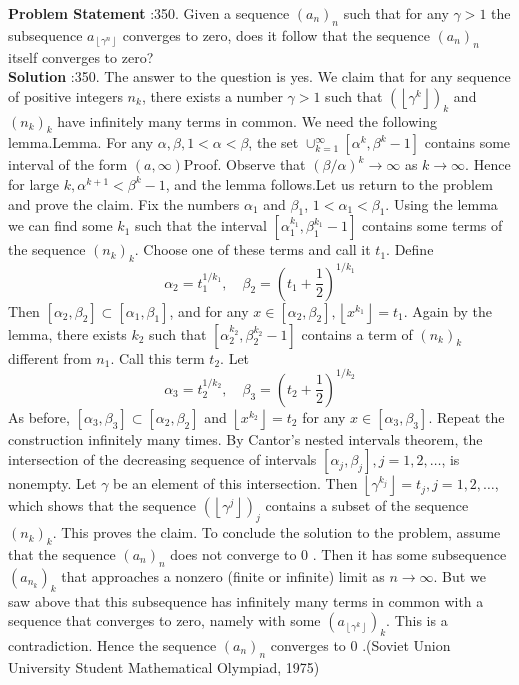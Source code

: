 \documentclass[10pt]{article}
\begin{document}
\textbf{Problem Statement} :350. Given a sequence $\left(a_{n}\right)_{n}$ such that for any $\gamma>1$ the subsequence $a_{\left\lfloor\gamma^{n}\right\rfloor}$ converges to zero, does it follow that the sequence $\left(a_{n}\right)_{n}$ itself converges to zero?\\
\textbf{Solution} :350. The answer to the question is yes. We claim that for any sequence of positive integers $n_{k}$, there exists a number $\gamma>1$ such that $\left(\left\lfloor\gamma^{k}\right\rfloor\right)_{k}$ and $\left(n_{k}\right)_{k}$ have infinitely many terms in common. We need the following lemma.Lemma. For any $\alpha, \beta, 1<\alpha<\beta$, the set $\cup_{k=1}^{\infty}\left[\alpha^{k}, \beta^{k}-1\right]$ contains some interval of the form $(a, \infty)$Proof. Observe that $(\beta / \alpha)^{k} \rightarrow \infty$ as $k \rightarrow \infty$. Hence for large $k, \alpha^{k+1}<\beta^{k}-1$, and the lemma follows.Let us return to the problem and prove the claim. Fix the numbers $\alpha_{1}$ and $\beta_{1}$, $1<\alpha_{1}<\beta_{1}$. Using the lemma we can find some $k_{1}$ such that the interval $\left[\alpha_{1}^{k_{1}}, \beta_{1}^{k_{1}}-1\right]$ contains some terms of the sequence $\left(n_{k}\right)_{k}$. Choose one of these terms and call it $t_{1}$. Define$$ \alpha_{2}=t_{1}^{1 / k_{1}}, \quad \beta_{2}=\left(t_{1}+\frac{1}{2}\right)^{1 / k_{1}} $$Then $\left[\alpha_{2}, \beta_{2}\right] \subset\left[\alpha_{1}, \beta_{1}\right]$, and for any $x \in\left[\alpha_{2}, \beta_{2}\right],\left\lfloor x^{k_{1}}\right\rfloor=t_{1}$. Again by the lemma, there exists $k_{2}$ such that $\left[\alpha_{2}^{k_{2}}, \beta_{2}^{k_{2}}-1\right]$ contains a term of $\left(n_{k}\right)_{k}$ different from $n_{1}$. Call this term $t_{2}$. Let$$ \alpha_{3}=t_{2}^{1 / k_{2}}, \quad \beta_{3}=\left(t_{2}+\frac{1}{2}\right)^{1 / k_{2}} $$As before, $\left[\alpha_{3}, \beta_{3}\right] \subset\left[\alpha_{2}, \beta_{2}\right]$ and $\left\lfloor x^{k_{2}}\right\rfloor=t_{2}$ for any $x \in\left[\alpha_{3}, \beta_{3}\right]$. Repeat the construction infinitely many times. By Cantor's nested intervals theorem, the intersection of the decreasing sequence of intervals $\left[\alpha_{j}, \beta_{j}\right], j=1,2, \ldots$, is nonempty. Let $\gamma$ be an element of this intersection. Then $\left\lfloor\gamma^{k_{j}}\right\rfloor=t_{j}, j=1,2, \ldots$, which shows that the sequence $\left(\left\lfloor\gamma^{j}\right\rfloor\right)_{j}$ contains a subset of the sequence $\left(n_{k}\right)_{k}$. This proves the claim. To conclude the solution to the problem, assume that the sequence $\left(a_{n}\right)_{n}$ does not converge to 0 . Then it has some subsequence $\left(a_{n_{k}}\right)_{k}$ that approaches a nonzero (finite or infinite) limit as $n \rightarrow \infty$. But we saw above that this subsequence has infinitely many terms in common with a sequence that converges to zero, namely with some $\left(a_{\left\lfloor\gamma^{k}\right\rfloor}\right)_{k}$. This is a contradiction. Hence the sequence $\left(a_{n}\right)_{n}$ converges to 0 .(Soviet Union University Student Mathematical Olympiad, 1975)\\
\end{document}
